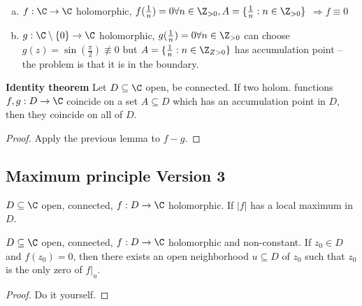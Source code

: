 \begin{example}
  \begin{enumerate}[(a)]
    \item $f: \C \to \C$ holomorphic, $f(\frac{1}{n})=0 \forall n \in \Z_{>0}, A=\{\frac{1}{n} : n \in \Z_{>0}\}$ $\Rightarrow f \equiv 0$
    \item $g: \C \setminus\{0\} \to \C$ holomorphic, $g(\frac{1}{n})=0 \forall n \in \Z_{>0}$ can choose $g(z)=\sin(\frac{\pi}{2})\not\equiv 0$ but $A=\{\frac{1}{n}: n \in \Z_{Z>0}\}$ has accumulation point -- the problem is that it is in the boundary.
  \end{enumerate}
\end{example}

\begin{theorem}
  \textbf{Identity theorem}
  \newline Let $D\subseteq \C$ open, be connected. If two holom. functions $f,g: D\to \C$ coincide on a set $A\subseteq D$ which has an accumulation point in $D$, then they coincide on all of $D$.
\end{theorem}
\begin{proof}
  Apply the previous lemma to $f-g$.
  \qedhere
\end{proof}

\subsection*{Maximum principle Version 3}
$D\subseteq \C$ open, connected, $f:D\to \C$ holomorphic. If $|f|$ has a local maximum in $D$.

\begin{corollary}
  $D\subseteq \C$ open, connected, $f:D\to \C$ holomorphic and non-constant. If $z_0 \in D$ and $f(z_0)=0$, then there exists an open neighborhood $u\subseteq D$ of $z_0$ such that $z_0$ is the only zero of $f\rvert_u$.
\end{corollary}
\begin{proof}
  Do it yourself.
\end{proof}


